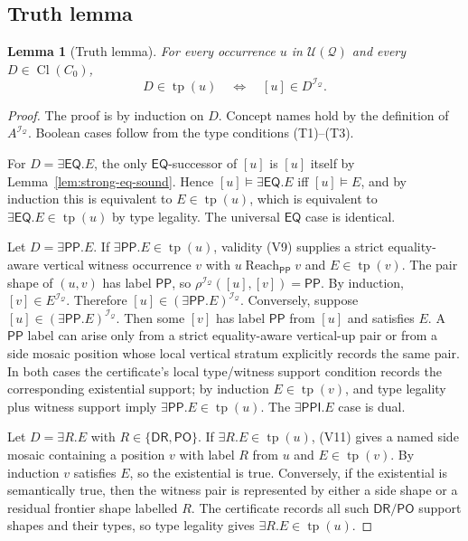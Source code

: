 \documentclass[11pt]{article}
\newtheorem{lemma}[theorem]{Lemma}
\newcommand{\EQ}{\mathsf{EQ}}
\newcommand{\DR}{\mathsf{DR}}
\newcommand{\PO}{\mathsf{PO}}
\newcommand{\PP}{\mathsf{PP}}
\newcommand{\PPI}{\mathsf{PPI}}
\newcommand{\Cl}{\operatorname{Cl}}
\newcommand{\I}{\mathcal I}
\newcommand{\Q}{\mathcal Q}
\newcommand{\U}{\mathcal U}
\newcommand{\typ}{\operatorname{tp}}
\newcommand{\reach}{\operatorname{Reach}}
\begin{document}
\subsection{Truth lemma}

\begin{lemma}[Truth lemma]\label{lem:truth}
For every occurrence $u$ in $\U(\Q)$ and every $D\in\Cl(C_0)$,
\[
   D\in\typ(u)
   \quad\Longleftrightarrow\quad
   [u]\in D^{\I_\Q}.
\]
\end{lemma}

\begin{proof}
The proof is by induction on $D$.  Concept names hold by the definition of $A^{\I_\Q}$.  Boolean cases follow from the type conditions (T1)--(T3).

For $D=\exists\EQ.E$, the only $\EQ$-successor of $[u]$ is $[u]$ itself by Lemma~\ref{lem:strong-eq-sound}.  Hence $[u]\models\exists\EQ.E$ iff $[u]\models E$, and by induction this is equivalent to $E\in\typ(u)$, which is equivalent to $\exists\EQ.E\in\typ(u)$ by type legality.  The universal $\EQ$ case is identical.

Let $D=\exists\PP.E$.  If $\exists\PP.E\in\typ(u)$, validity (V9) supplies a strict equality-aware vertical witness occurrence $v$ with $u\reach_\PP v$ and $E\in\typ(v)$.  The pair shape of $(u,v)$ has label $\PP$, so $\rho^{\I_\Q}([u],[v])=\PP$.  By induction, $[v]\in E^{\I_\Q}$.  Therefore $[u]\in(\exists\PP.E)^{\I_\Q}$.  Conversely, suppose $[u]\in(\exists\PP.E)^{\I_\Q}$.  Then some $[v]$ has label $\PP$ from $[u]$ and satisfies $E$.  A $\PP$ label can arise only from a strict equality-aware vertical-up pair or from a side mosaic position whose local vertical stratum explicitly records the same pair.  In both cases the certificate's local type/witness support condition records the corresponding existential support; by induction $E\in\typ(v)$, and type legality plus witness support imply $\exists\PP.E\in\typ(u)$.  The $\exists\PPI.E$ case is dual.

Let $D=\exists R.E$ with $R\in\{\DR,\PO\}$.  If $\exists R.E\in\typ(u)$, (V11) gives a named side mosaic containing a position $v$ with label $R$ from $u$ and $E\in\typ(v)$.  By induction $v$ satisfies $E$, so the existential is true.  Conversely, if the existential is semantically true, then the witness pair is represented by either a side shape or a residual frontier shape labelled $R$.  The certificate records all such $\DR/\PO$ support shapes and their types, so type legality gives $\exists R.E\in\typ(u)$.


\end{proof}
\end{document}
